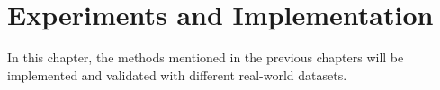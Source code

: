 \chapter{Experiments and Implementation}
In this chapter, the methods mentioned in the previous chapters will be implemented and validated with different real-world datasets.



